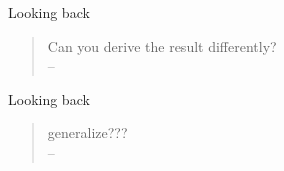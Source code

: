 \begin{frame}{Looking back}
  \begin{quote}
    \begin{center}
      Can you derive the result differently? \\
      \hspace{3.0cm} -- \GP{}
    \end{center}
  \end{quote}
\end{frame}

\begin{frame}{Looking back}
  \begin{quote}
    \begin{center}
      generalize??? \\
      \hspace{3.0cm} -- \GP{}
    \end{center}
  \end{quote}
\end{frame}
